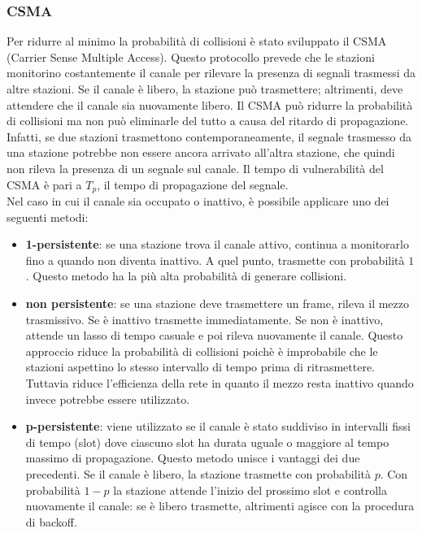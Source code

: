 \documentclass[12pt]{report}
\begin{document}
\subsubsection{CSMA}
Per ridurre al minimo la probabilità di collisioni è stato sviluppato il CSMA (Carrier Sense Multiple Access). Questo protocollo prevede che le stazioni monitorino costantemente il canale per rilevare la presenza di segnali trasmessi da altre stazioni. Se il canale è libero, la stazione può trasmettere; altrimenti, deve attendere che il canale sia nuovamente libero. Il CSMA può ridurre la probabilità di collisioni ma non può eliminarle del tutto a causa del ritardo di propagazione. Infatti, se due stazioni trasmettono contemporaneamente, il segnale trasmesso da una stazione potrebbe non essere ancora arrivato all'altra stazione, che quindi non rileva la presenza di un segnale sul canale. Il tempo di vulnerabilità del CSMA è pari a \(T_p\), il tempo di propagazione del segnale.
\vspace{\baselineskip}\\
Nel caso in cui il canale sia occupato o inattivo, è possibile applicare uno dei seguenti metodi:
\begin{itemize}
	\item \textbf{1-persistente}: se una stazione trova il canale attivo, continua a monitorarlo fino a quando non diventa inattivo. A quel punto, trasmette con probabilità \(1\). Questo metodo ha la più alta probabilità di generare collisioni.
	\item \textbf{non persistente}: se una stazione deve trasmettere un frame, rileva il mezzo trasmissivo. Se è inattivo trasmette immediatamente. Se non è inattivo, attende un lasso di tempo casuale e poi rileva nuovamente il canale. Questo approccio riduce la probabilità di collisioni poichè è improbabile che le stazioni aspettino lo stesso intervallo di tempo prima di ritrasmettere. Tuttavia riduce l'efficienza della rete in quanto il mezzo resta inattivo quando invece potrebbe essere utilizzato.
	\item \textbf{p-persistente}: viene utilizzato se il canale è stato suddiviso in intervalli fissi di tempo (slot) dove ciascuno slot ha durata uguale o maggiore al tempo massimo di propagazione. Questo metodo unisce i vantaggi dei due precedenti. Se il canale è libero, la stazione trasmette con probabilità \(p\). Con probabilità \(1-p\) la stazione attende l'inizio del prossimo slot e controlla nuovamente il canale: se è libero trasmette, altrimenti agisce con la procedura di backoff.
\end{itemize}
\end{document}
